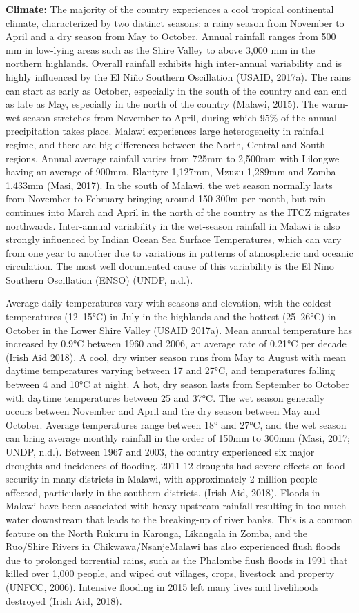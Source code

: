 \documentclass[
]{book}
\begin{document}
\textbf{Climate:} The majority of the country experiences a cool tropical continental climate, characterized by two distinct seasons: a rainy season from November to
April and a dry season from May to October. Annual rainfall ranges from 500 mm in low-lying areas such as the Shire Valley to above 3,000 mm in the northern
highlands. Overall rainfall exhibits high inter-annual variability and is highly influenced by the El Niño Southern Oscillation (USAID, 2017a). The rains can
start as early as October, especially in the south of the country and can end as late as May, especially in the north of the country (Malawi, 2015). The warm-wet
season stretches from November to April, during which 95\% of the annual precipitation takes place. Malawi experiences large heterogeneity in rainfall regime, and
there are big differences between the North, Central and South regions. Annual average rainfall varies from 725mm to 2,500mm with Lilongwe having an average of
900mm, Blantyre 1,127mm, Mzuzu 1,289mm and Zomba 1,433mm (Masi, 2017). In the south of Malawi, the wet season normally lasts from November to February bringing
around 150‐300m per month, but rain continues into March and April in the north of the country as the ITCZ migrates northwards. Inter‐annual variability in the
wet‐season rainfall in Malawi is also strongly influenced by Indian Ocean Sea Surface Temperatures, which can vary from one year to another due to variations in
patterns of atmospheric and oceanic circulation. The most well documented cause of this variability is the El Nino Southern Oscillation (ENSO) (UNDP, n.d.).

Average daily temperatures vary with seasons and elevation, with the coldest temperatures (12--15°C) in July in the highlands and the hottest (25--26°C) in October
in the Lower Shire Valley (USAID 2017a). Mean annual temperature has increased by 0.9°C between 1960 and 2006, an average rate of 0.21°C per decade (Irish Aid
2018). A cool, dry winter season runs from May to August with mean daytime temperatures varying between 17 and 27°C, and temperatures falling between 4 and 10°C
at night. A hot, dry season lasts from September to October with daytime temperatures between 25 and 37°C. The wet season generally occurs between November
and April and the dry season between May and October. Average temperatures range between 18° and 27°C, and the wet season can bring average monthly rainfall in
the order of 150mm to 300mm (Masi, 2017; UNDP, n.d.). Between 1967 and 2003, the country experienced six major droughts and incidences of flooding. 2011-12
droughts had severe effects on food security in many districts in Malawi, with approximately 2 million people affected, particularly in the southern districts.
(Irish Aid, 2018). Floods in Malawi have been associated with heavy upstream rainfall resulting in too much water downstream that leads to the breaking-up of
river banks. This is a common feature on the North Rukuru in Karonga, Likangala in Zomba, and the Ruo/Shire Rivers in Chikwawa/NsanjeMalawi has also experienced
flush floods due to prolonged torrential rains, such as the Phalombe flush floods in 1991 that killed over 1,000 people, and wiped out villages, crops, livestock
and property (UNFCC, 2006). Intensive flooding in 2015 left many lives and livelihoods destroyed (Irish Aid, 2018).
\end{document}
